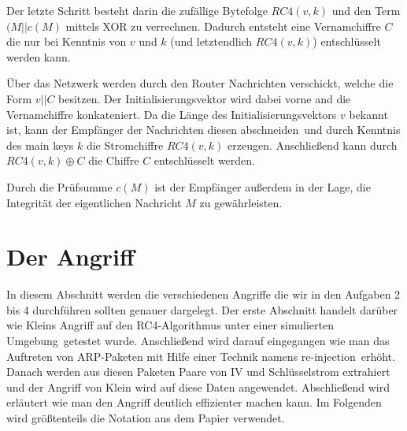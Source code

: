 \documentclass[10pt,a4paper]{article}
\begin{document}
Der letzte Schritt besteht darin die zufällige Bytefolge $RC4(v,k)$ und den Term $(M || c(M)$ mittels XOR zu verrechnen. Dadurch entsteht eine Vernamchiffre $C$ die nur bei Kenntnis von $v$ und $k$ (und letztendlich $RC4(v,k)$) entschlüsselt werden kann.

Über das Netzwerk werden durch den Router Nachrichten verschickt, welche die Form $v || C$ besitzen. Der Initialisierungsvektor wird dabei vorne and die Vernamchiffre konkateniert. Da die Länge des Initialisierungsvektors $v$ bekannt ist, kann der Empfänger der Nachrichten diesen \glqq abschneiden\grqq\ und durch Kenntnis des main keys $k$ die Stromchiffre $RC4(v,k)$ erzeugen. Anschließend kann durch $RC4(v,k) \oplus C$ die Chiffre $C$ entschlüsselt werden.

Durch die Prüfsumme $c(M)$ ist der Empfänger außerdem in der Lage, die Integrität der eigentlichen Nachricht $M$ zu gewährleisten. 

\section{Der Angriff}
In diesem Abschnitt werden die verschiedenen Angriffe die wir in den Aufgaben 2 bis 4 durchführen sollten genauer dargelegt. Der erste Abschnitt handelt darüber wie Kleins Angriff auf den RC4-Algorithmus unter einer \glqq simulierten Umgebung\grqq \ getestet wurde. Anschließend wird darauf eingegangen wie man das Auftreten von ARP-Paketen  mit Hilfe einer Technik namens \glqq re-injection\grqq \ erhöht. Danach werden aus diesen Paketen Paare von IV und Schlüsselstrom extrahiert und der Angriff von Klein wird auf diese Daten angewendet. Abschließend wird erläutert wie man den Angriff deutlich effizienter machen kann. Im Folgenden wird größtenteils die Notation aus dem Papier \cite[Kapitel 3.1]{TWP07} verwendet.
\end{document}
